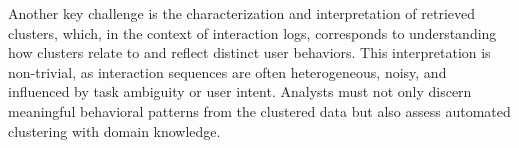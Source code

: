 \documentclass[preprint,journal]{vgtc}            %
\begin{document}
Another key challenge is the characterization and interpretation of retrieved clusters, which, in the context of interaction logs, corresponds to %
understanding how clusters relate to and reflect distinct user behaviors.
This interpretation is non-trivial, as interaction sequences are often heterogeneous, noisy, and influenced by task ambiguity or user intent. 
Analysts must not only discern meaningful behavioral patterns from the clustered data but also assess automated clustering with domain knowledge.
\end{document}
